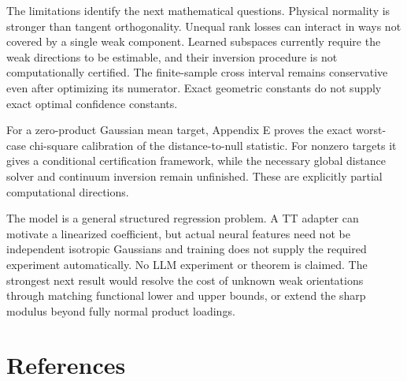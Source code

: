 \documentclass[
  11pt,
]{article}
\begin{document}
The limitations identify the next mathematical questions. Physical
normality is stronger than tangent orthogonality. Unequal rank losses
can interact in ways not covered by a single weak component. Learned
subspaces currently require the weak directions to be estimable, and
their inversion procedure is not computationally certified. The
finite-sample cross interval remains conservative even after optimizing
its numerator. Exact geometric constants do not supply exact optimal
confidence constants.

For a zero-product Gaussian mean target, Appendix E proves the exact
worst-case chi-square calibration of the distance-to-null statistic. For
nonzero targets it gives a conditional certification framework, while
the necessary global distance solver and continuum inversion remain
unfinished. These are explicitly partial computational directions.

The model is a general structured regression problem. A TT adapter can
motivate a linearized coefficient, but actual neural features need not
be independent isotropic Gaussians and training does not supply the
required experiment automatically. No LLM experiment or theorem is
claimed. The strongest next result would resolve the cost of unknown
weak orientations through matching functional lower and upper bounds, or
extend the sharp modulus beyond fully normal product loadings.

\section*{References}\label{references}
\end{document}
